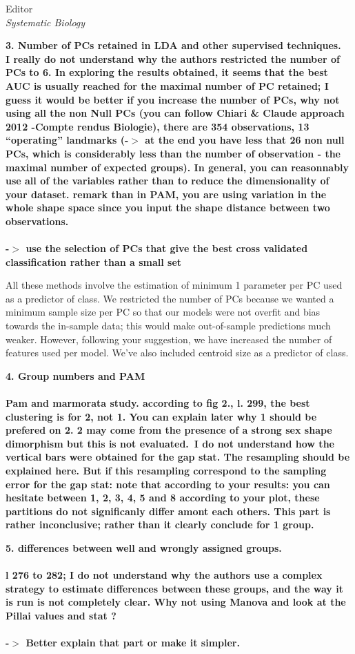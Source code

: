 \documentclass{letter}
\begin{document}
\begin{letter}{Editor \\ \textit{Systematic Biology}}


  \textbf{3. Number of PCs retained in LDA and other supervised techniques. 
    I really do not understand why the authors restricted the number of PCs to 6. In exploring the results obtained, it seems that the best AUC is usually reached for the maximal number of PC retained; I guess it would be better if you increase the number of PCs, why not using all the non Null PCs (you can follow Chiari \& Claude approach 2012 -Compte rendus Biologie), there are 354 observations, 13 ``operating'' landmarks (-\(>\) at the end you have less that 26 non null PCs, which is considerably less than the number of observation - the maximal number of expected groups). In general, you can reasonnably use all of the variables rather than to reduce the dimensionality of your dataset. remark than in PAM, you are using variation in the whole shape space since you input the shape distance between two observations. \\\\
  -\(>\) use the selection of PCs that give the best cross validated classification rather than a small set }

  All these methods involve the estimation of minimum 1 parameter per PC used as a predictor of class. We restricted the number of PCs because we wanted a minimum sample size per PC so that our models were not overfit and bias towards the in-sample data; this would make out-of-sample predictions much weaker. However, following your suggestion, we have increased the number of features used per model. We've also included centroid size as a predictor of class.


  \textbf{4. Group numbers and PAM \\\\
  Pam and marmorata study. according to fig 2., l. 299, the best clustering is for 2, not 1. You can explain later why 1 should be prefered on 2. 2 may come from the presence of a strong sex shape dimorphism but this is not evaluated. I do not understand how the vertical bars were obtained for the gap stat. The resampling should be explained here. But if this resampling correspond to the sampling error for the gap stat: note that according to your results: you can hesitate between 1, 2, 3, 4, 5 and 8 according to your plot, these partitions do not significanly differ amont each others. This part is rather inconclusive; rather than it clearly conclude for 1 group. }


  \textbf{5. differences between well and wrongly assigned groups. \\\\
    l 276 to 282; I do not understand why the authors use a complex strategy to estimate differences between these groups, and the way it is run is not completely clear. Why not using Manova and look at the Pillai values and stat ? \\\\
  -\(>\) Better explain that part or make it simpler. }


\end{letter}
\end{document}
